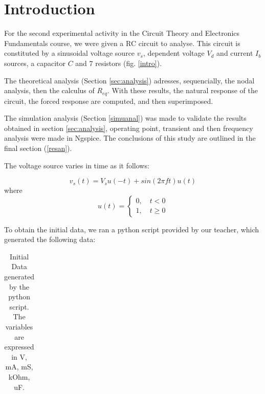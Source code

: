 \section{Introduction}

For the second experimental activity in the Circuit Theory and Electronics Fundamentals course, we were given a RC circuit to analyse.
This circuit is constituted by a sinusoidal voltage source $v_s$, dependent voltage $V_d$ and current $I_b$ sources, a capacitor $C$ and 7 resistors (fig. \ref{intro}).

The theoretical analysis (Section \ref{sec:analysis}) adresses, sequencially, the nodal analysis, then the calculus of $R_{eq}$. With these results, the natural response of the circuit, the forced response are computed, and then superimposed.

The simulation analysis (Section \ref{simuanal}) was made to validate the results obtained in section \ref{sec:analysis}, operating point, transient and then frequency analysis were made in Ngspice.
The conclusions of this study are outlined in the final section (\ref{resan}).

The voltage source varies in time as it follows:



\begin{equation}
v_s(t) = V_s u(-t) + sin(2\pi ft)u(t)
\end{equation}
where
\begin{equation}
u(t)=\begin{cases} 0, \quad t<0 \\ 1, \quad t \geq 0  \end{cases}
\end{equation}


To obtain the initial data, we ran a python script provided by our teacher, which generated the following data:\\

\begin{table}[h]
\centering
\begin{tabularx}{0.6\textwidth} {
  | >{\raggedright\arraybackslash}X
  | >{\raggedleft\arraybackslash}X | }
 \hline

\end{tabularx}
\caption{Initial Data generated by the python script. The variables are expressed in V, mA, mS, kOhm, uF.}
\end{table}

